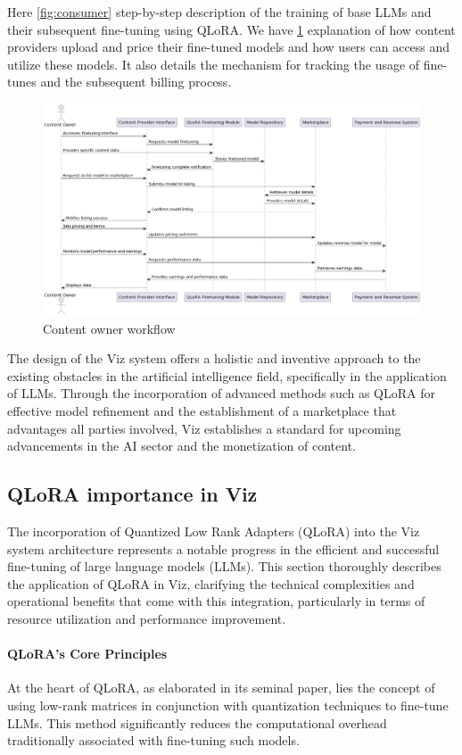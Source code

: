 \documentclass{article}
\begin{document}
Here \ref{fig:consumer} step-by-step description of the training of base LLMs and their subsequent fine-tuning using QLoRA.  We have \ref{fig:content-owner} explanation of how content providers upload and price their fine-tuned models and how users can access and utilize these models. It also details the mechanism for tracking the usage of fine-tunes and the subsequent billing process.

\begin{figure}[ht]
    \centering
    \includegraphics[width=1.0\linewidth]{viz-3.png}
    \caption{Content owner workflow}
    \label{fig:content-owner}
\end{figure}

The design of the Viz system offers a holistic and inventive approach to the existing obstacles in the artificial intelligence field, specifically in the application of LLMs. Through the incorporation of advanced methods such as QLoRA for effective model refinement and the establishment of a marketplace that advantages all parties involved, Viz establishes a standard for upcoming advancements in the AI sector and the monetization of content.
\subsection{QLoRA importance in Viz}

The incorporation of Quantized Low Rank Adapters (QLoRA) into the Viz system architecture represents a notable progress in the efficient and successful fine-tuning of large language models (LLMs). This section thoroughly describes the application of QLoRA in Viz, clarifying the technical complexities and operational benefits that come with this integration, particularly in terms of resource utilization and performance improvement.

\paragraph{QLoRA's Core Principles} At the heart of QLoRA, as elaborated in its seminal paper, lies the concept of using low-rank matrices in conjunction with quantization techniques to fine-tune LLMs. This method significantly reduces the computational overhead traditionally associated with fine-tuning such models.
\end{document}

